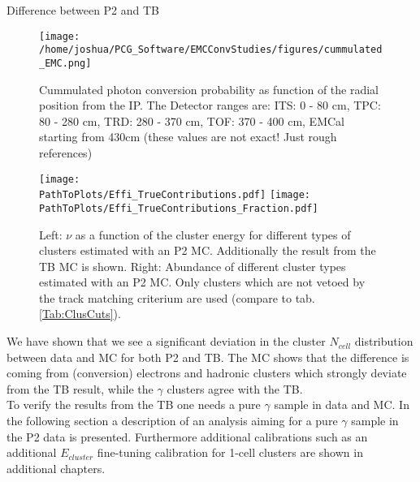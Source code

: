 \documentclass[ALICE]{ALICE_analysis_notes}
\newcommand{\g}{$\gamma$\xspace}
\newcommand{\PathToPlots}{/home/joshua/PCG_Software/EMCal_NCellEffi/13TeVNomB_Wide/Pi0Tagging_13TeV_nom_04_26_WithTRD_WithBorderCells_1cellFT/pdf}
\begin{document}
\begin{section}{Difference between P2 and TB}
\begin{figure}[t]
	\centering
	\texttt{[image: /home/joshua/PCG\_Software/EMCConvStudies/figures/cummulated\_EMC.png]}
	\caption{Cummulated photon conversion probability as function of the radial position from the IP. The Detector ranges are: ITS: 0 - 80 cm, TPC: 80 - 280 cm, TRD: 280 - 370 cm, TOF: 370 - 400 cm, EMCal starting from 430cm (these values are not exact! Just rough references) }
	\label{fig:NCells_Conversions}
\end{figure}


\begin{figure}[t]
	\centering
	\texttt{[image: \\PathToPlots/Effi\_TrueContributions.pdf]}
	\texttt{[image: \\PathToPlots/Effi\_TrueContributions\_Fraction.pdf]}
	\caption{Left: $\nu$ as a function of the cluster energy for different types of clusters estimated with an P2 MC. Additionally the result from the TB MC is shown. Right: Abundance of different cluster types estimated with an P2 MC. Only clusters which are not vetoed by the track matching criterium are used (compare to tab. \ref{Tab:ClusCuts}).}
	\label{fig:NCells_Conversions2}
\end{figure}


We have shown that we see a significant deviation in the cluster $N_{cell}$ distribution between data and MC for both P2 and TB. The MC shows that the difference is coming from (conversion) electrons and hadronic clusters which strongly deviate from the TB result, while the $\gamma$ clusters agree with the TB.\\
To verify the results from the TB one needs a pure \g sample in data and MC. In the following section a description of an analysis aiming for a pure \g sample in the P2 data is presented.
Furthermore additional calibrations such as an additional $E_{cluster}$ fine-tuning calibration for 1-cell clusters are shown in additional chapters.
\end{section}
\end{document}
